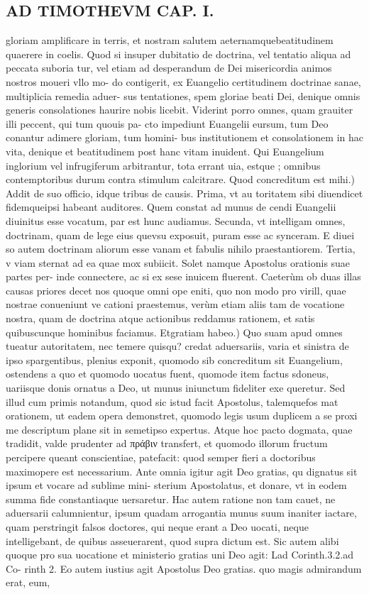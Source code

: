 \documentclass{article}
\begin{document}
\begin{pages}
\section*{AD TIMOTHEVM CAP. I. }
\marginpar{[ p.30 ]}\pstart gloriam amplificare in terris, et nostram salutem aeternamquebeatitudinem quaerere in coelis. Quod si insuper dubitatio de doctrina, vel tentatio aliqua ad peccata suboria tur, vel etiam ad desperandum de Dei misericordia animos nostros moueri vllo mo- do contigerit, ex Euangelio certitudinem doctrinae sanae, multiplicia remedia aduer- sus tentationes, spem gloriae beati Dei, denique  omnis generis consolationes haurire nobis licebit. Viderint porro omnes, quam grauiter illi peccent, qui tum quouis pa- cto impediunt Euangelii eursum, tum Deo conantur adimere gloriam, tum homini- bus institutionem et consolationem in hac vita, denique  et beatitudinem post hanc vitam inuident. Qui Euangelium inglorium vel infrugiferum arbitrantur, tota errant uia, estque ; omnibus contemptoribus durum contra stimulum calcitrare.  \pend\pstart Quod concreditum est mihi.) Addit de suo officio, idque  tribus de causis. Prima, vt au toritatem sibi diuendicet fidemqueipsi habeant auditores. Quem constat ad munus de cendi Euangelii diuinitus esse vocatum, par est hunc audiamus. Secunda, vt intelligam omnes, doctrinam, quam de lege eius quevsu exposuit, puram esse ac synceram. E diuei so autem doctrinam aliorum esse vanam et fabulis nihilo praestantiorem. Tertia, v viam sternat ad ea quae mox subiicit. Solet namque  Apostolus orationis suae partes per- inde connectere, ac si ex sese inuicem fluerent. Caeterùm ob duas illas causas priores decet nos quoque  omni ope eniti, quo non modo pro virill, quae nostrae conueniunt ve cationi praestemus, verùm etiam aliis tam de vocatione nostra, quam de doctrina atque  actionibus reddamus rationem, et satis quibuscunque  hominibus faciamus.  \pend\pstart Etgratiam habeo.) Quo suam apud omnes tueatur autoritatem, nec temere quisqu? credat aduersariis, varia et sinistra de ipso spargentibus, plenius exponit, quomodo sib concreditum sit Euangelium, ostendens a quo et quomodo uocatus fuent, quomode item factus sdoneus, uariisque  donis ornatus a Deo, ut munus iniunctum fideliter exe queretur. Sed illud cum primis notandum, quod sic istud facit Apostolus, talemquefos mat orationem, ut eadem opera demonstret, quomodo legis usum duplicem a se proxi me descriptum plane sit in semetipso expertus. Atque  hoc pacto dogmata, quae tradidit, valde prudenter ad πράβιν transfert, et quomodo illorum fructum percipere queant conscientiae, patefacit: quod semper fieri a doctoribus maximopere est necessarium. Ante omnia igitur agit Deo gratias, qu dignatus sit ipsum et vocare ad sublime mini- sterium Apostolatus, et donare, vt in eodem summa fide constantiaque  uersaretur. Hac autem ratione non tam cauet, ne aduersarii calumnientur, ipsum quadam arrogantia munus suum inaniter iactare, quam perstringit falsos doctores, qui neque  erant a Deo uocati, neque  intelligebant, de quibus asseuerarent, quod supra dictum est. Sic autem alibi quoque pro sua uocatione et ministerio gratias uni Deo agit: Lad Corinth.3.2.ad Co- rinth 2. Eo autem iustius agit Apostolus Deo gratias. quo magis admirandum erat, eum, 
\end{pages}
\end{document}

